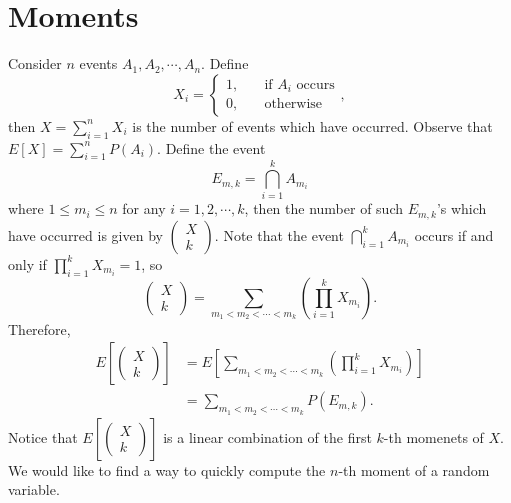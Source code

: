\documentclass[math]{amznotes}
\theoremstyle{remark}
\begin{document}
\section{Moments}
Consider $n$ events $A_1, A_2, \cdots, A_n$. Define
\begin{equation*}
    X_i = \begin{cases}
        1, & \quad\textrm{if } A_i \textrm{ occurs} \\
        0, & \quad\textrm{otherwise}
    \end{cases},
\end{equation*}
then $X = \sum_{i = 1}^{n}X_i$ is the number of events which have occurred. Observe that $E[X] = \sum_{i = 1}^{n}P(A_i)$. Define the event
\begin{equation*}
    E_{m, k} = \bigcap_{i = 1}^{k}A_{m_i}
\end{equation*}
where $1 \leq m_i \leq n$ for any $i = 1, 2, \cdots, k$, then the number of such $E_{m, k}$'s which have occurred is given by $\left(\begin{smallmatrix}
    X \\
    k
\end{smallmatrix}\right)$. Note that the event $\bigcap_{i = 1}^{k}A_{m_i}$ occurs if and only if $\prod_{i = 1}^{k}X_{m_i} = 1$, so
\begin{equation*}
    \begin{pmatrix}
        X \\
        k
    \end{pmatrix} = \sum_{m_1 < m_2 < \cdots < m_k}\left(\prod_{i = 1}^{k}X_{m_i}\right).
\end{equation*}
Therefore, 
\begin{align*}
    E\left[\begin{pmatrix}
        X \\
        k
    \end{pmatrix}\right] & = E\left[\sum_{m_1 < m_2 < \cdots < m_k}\left(\prod_{i = 1}^{k}X_{m_i}\right)\right] \\
    & = \sum_{m_1 < m_2 < \cdots < m_k}P\left(E_{m, k}\right).
\end{align*}
Notice that $E\left[\left(\begin{smallmatrix}
    X \\
    k
\end{smallmatrix}\right)\right]$ is a linear combination of the first $k$-th momenets of $X$. We would like to find a way to quickly compute the $n$-th moment of a random variable.
\end{document}
